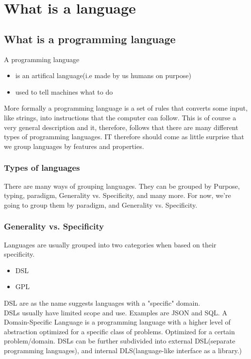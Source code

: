 \section{What is a language}
\subsection{What is a programming language}
    A programming language 
    \begin{itemize}
        \item is an artifical language(i.e made by us humans on purpose)
        \item used to tell machines what to do
    \end{itemize}
    More formally a programming language is a set of rules that converts some input, like strings, into instructions that the computer can follow.
    This is of course a very general description and it, therefore, follows that there are many different types of programming languages.
    IT therefore should come as little surprise that we group languages by features and properties. 
    \subsubsection{Types of languages}
    There are many ways of grouping languages. They can be grouped by Purpose, typing, paradigm, Generality vs. Specificity, and many more.
    For now, we're going to group them by paradigm, and Generality vs. Specificity.
    \subsubsection*{Generality vs. Specificity}
    Languages are usually grouped into two categories when based on their specificity.
    \begin{itemize}
        \item DSL
        \item GPL
    \end{itemize}

    \Gls{DSL} are as the name suggests languages with a "specific" domain.\\
    DSLs usually have limited scope and use. Examples are JSON and SQL.     
    A Domain-Specific Language is a programming language with a higher level of abstraction optimized for a specific class of problems. 
    Optimized for a certain problem/domain. 
    DSLs can be further subdivided into external DSL(separate programming languages), and internal DLS(language-like interface as a library.)

